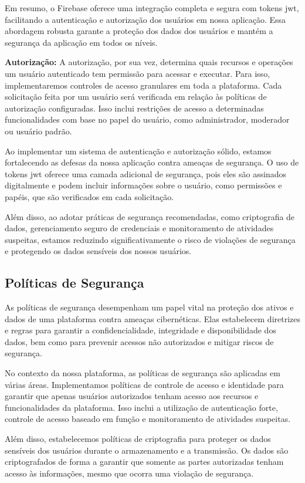 Em resumo, o Firebase oferece uma integração completa e segura com tokens \acs{jwt}, facilitando a autenticação e autorização dos usuários em nossa aplicação. Essa abordagem robusta garante a proteção dos dados dos usuários e mantém a segurança da aplicação em todos os níveis.

\textbf{Autorização:}
A autorização, por sua vez, determina quais recursos e operações um usuário autenticado tem permissão para acessar e executar. Para isso, implementaremos controles de acesso granulares em toda a plataforma. Cada solicitação feita por um usuário será verificada em relação às políticas de autorização configuradas. Isso inclui restrições de acesso a determinadas funcionalidades com base no papel do usuário, como administrador, moderador ou usuário padrão.

Ao implementar um sistema de autenticação e autorização sólido, estamos fortalecendo as defesas da nossa aplicação contra ameaças de segurança. O uso de tokens \acs{jwt} oferece uma camada adicional de segurança, pois eles são assinados digitalmente e podem incluir informações sobre o usuário, como permissões e papéis, que são verificados em cada solicitação.

Além disso, ao adotar práticas de segurança recomendadas, como criptografia de dados, gerenciamento seguro de credenciais e monitoramento de atividades suspeitas, estamos reduzindo significativamente o risco de violações de segurança e protegendo os dados sensíveis dos nossos usuários.

\subsection{Políticas de Segurança}

As políticas de segurança desempenham um papel vital na proteção dos ativos e dados de uma plataforma contra ameaças cibernéticas. Elas estabelecem diretrizes e regras para garantir a confidencialidade, integridade e disponibilidade dos dados, bem como para prevenir acessos não autorizados e mitigar riscos de segurança.

No contexto da nossa plataforma, as políticas de segurança são aplicadas em várias áreas. Implementamos políticas de controle de acesso e identidade para garantir que apenas usuários autorizados tenham acesso aos recursos e funcionalidades da plataforma. Isso inclui a utilização de autenticação forte, controle de acesso baseado em função e monitoramento de atividades suspeitas.

Além disso, estabelecemos políticas de criptografia para proteger os dados sensíveis dos usuários durante o armazenamento e a transmissão. Os dados são criptografados de forma a garantir que somente as partes autorizadas tenham acesso às informações, mesmo que ocorra uma violação de segurança.

